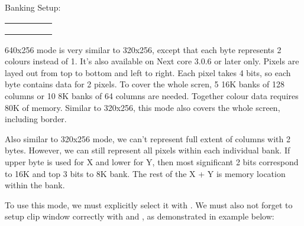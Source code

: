\begin{multicols}{2}
    Banking Setup:

    \begin{tabularx}{0.395\textwidth}{|c|c|c|c|Y|}
        \hline
         & 
             & 
             &
             &
             \\
        \hline
         & 
             \\
        \hline
         &
             &
             \\
        \hline
         &
             &
             \\
        \hline
    \end{tabularx}
\end{multicols}

640x256 mode is very similar to 320x256, except that each byte represents 2 colours instead of 1. It's also available on Next core 3.0.6 or later only. Pixels are layed out from top to bottom and left to right. Each pixel takes 4 bits, so each byte contains data for 2 pixels. To cover the whole scren, 5 16K banks of 128 columns or 10 8K banks of 64 columns are needed. Together colour data requires 80K of memory. Similar to 320x256, this mode also covers the whole screen, including border.

Also similar to 320x256 mode, we can't represent full extent of columns with 2 bytes. However, we can still represent all pixels within each individual bank. If upper byte is used for X and lower for Y, then most significant 2 bits correspond to 16K and top 3 bits to 8K bank. The rest of the X + Y is memory location within the bank.

To use this mode, we must explicitly select it with . We must also not forget to setup clip window correctly with  and , as demonstrated in example below:

